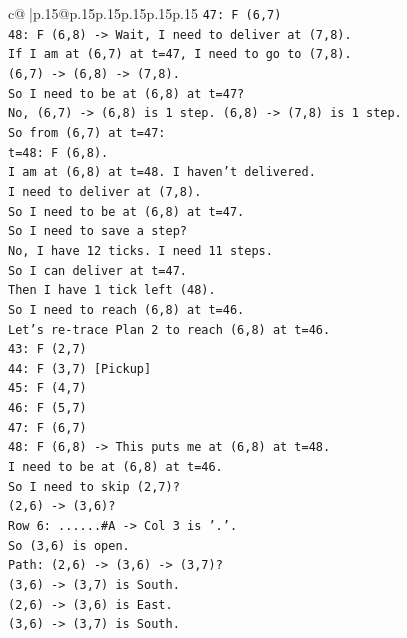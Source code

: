 \documentclass{article}
\begin{document}
{\begin{supertabular}{c@{$\;$}|p{.15\linewidth}@{}p{.15\linewidth}p{.15\linewidth}p{.15\linewidth}p{.15\linewidth}p{.15\linewidth}}
{{{\texttt{47: F (6,7)} \\
\texttt{48: F (6,8) {-}> Wait, I need to deliver at (7,8).} \\
\texttt{If I am at (6,7) at t=47, I need to go to (7,8).} \\
\texttt{(6,7) {-}> (6,8) {-}> (7,8).} \\
\texttt{So I need to be at (6,8) at t=47?} \\
\texttt{No, (6,7) {-}> (6,8) is 1 step. (6,8) {-}> (7,8) is 1 step.} \\
\texttt{So from (6,7) at t=47:} \\
\texttt{t=48: F (6,8).} \\
\texttt{I am at (6,8) at t=48. I haven't delivered.} \\
\texttt{I need to deliver at (7,8).} \\
\texttt{So I need to be at (6,8) at t=47.} \\
\texttt{So I need to save a step?} \\
\texttt{No, I have 12 ticks. I need 11 steps.} \\
\texttt{So I can deliver at t=47.} \\
\texttt{Then I have 1 tick left (48).} \\
\texttt{So I need to reach (6,8) at t=46.} \\
\texttt{Let's re{-}trace Plan 2 to reach (6,8) at t=46.} \\
\texttt{43: F (2,7)} \\
\texttt{44: F (3,7) {[}Pickup{]}} \\
\texttt{45: F (4,7)} \\
\texttt{46: F (5,7)} \\
\texttt{47: F (6,7)} \\
\texttt{48: F (6,8) {-}> This puts me at (6,8) at t=48.} \\
\texttt{I need to be at (6,8) at t=46.} \\
\texttt{So I need to skip (2,7)?} \\
\texttt{(2,6) {-}> (3,6)?} \\
\texttt{Row 6: ......\#A {-}> Col 3 is '.'.} \\
\texttt{So (3,6) is open.} \\
\texttt{Path: (2,6) {-}> (3,6) {-}> (3,7)?} \\
\texttt{(3,6) {-}> (3,7) is South.} \\
\texttt{(2,6) {-}> (3,6) is East.} \\
\texttt{(3,6) {-}> (3,7) is South.} \\
}}}
\end{supertabular}}
\end{document}
